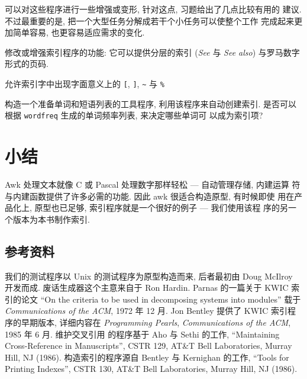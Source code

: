 可以对这些程序进行一些增强或变形, 针对这点, 习题给出了几点比较有用的
建议. 不过最重要的是, 把一个大型任务分解成若干个小任务可以使整个工作
完成起来更加简单容易, 也更容易适应需求的变化.

\begin{exercise}
    修改或增强索引程序的功能: 它可以提供分层的索引 (\textit{See} 与
    \textit{See also}) 与罗马数字形式的页码.
\end{exercise}

\begin{exercise}
    \label{exer:literal}
    允许索引字中出现字面意义上的 \texttt{[}, \texttt{]}, \verb'~' 与 
    \verb'%'
\end{exercise}

\begin{exercise}
    构造一个准备单词和短语列表的工具程序, 利用该程序来自动创建索引.
    是否可以根据 \texttt{wordfreq} 生成的单词频率列表, 来决定哪些单词可
    以成为索引项?
\end{exercise}

\section{小结}
\label{sec:processing_words_summary}

Awk 处理文本就像 C 或 Pascal 处理数字那样轻松 --- 自动管理存储, 内建运算
符与内建函数提供了许多必需的功能. 因此 awk 很适合构造原型, 有时候即使
用在产品化上, 原型也已足够, 索引程序就是一个很好的例子 --- 我们使用该程
序的另一个版本为本书制作索引.

\subsection*{参考资料}
我们的测试程序以 Unix 的测试程序为原型构造而来, 后者最初由 Doug McIlroy
开发而成. 废话生成器这个主意来自于 Ron Hardin. Parnas 的一篇关于
KWIC 索引的论文 ``On the criteria to be used in decomposing systems into
modules'' 载于 \textit{Communications of the ACM}, 1972 年 12 月.
Jon Bentley 提供了 KWIC 索引程序的早期版本, 详细内容在 \textit{Programming
Pearls}, \textit{Communications of the ACM}, 1985 年 6 月. 维护交叉引用
的程序基于 Aho 与 Sethi 的工作, ``Maintaining Cross-Reference in
Manuscripts'', CSTR 129, AT\&T Bell Laboratories, Murray Hill, NJ (1986). 
构造索引的程序源自 Bentley 与 Kernighan 的工作, ``Tools for Printing
Indexes'', CSTR 130, AT\&T Bell Laboratories, Murray Hill, NJ (1986).
